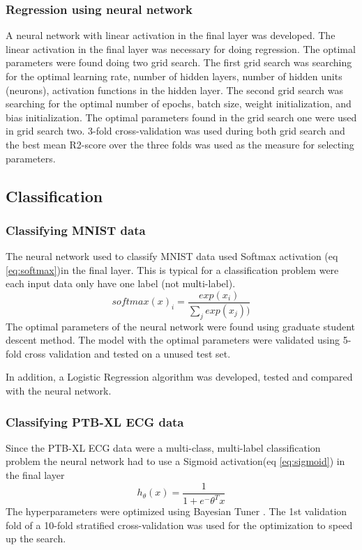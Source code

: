 \documentclass[twocolumn]{cinc}
\begin{document}
\subsubsection{Regression using neural network}
A neural network with linear activation in the final layer was developed. The linear activation in the final layer was necessary for doing regression. The optimal parameters were found doing two grid search. The first grid search was searching for the optimal learning rate, number of hidden layers, number of hidden units (neurons), activation functions in the hidden layer. The second grid search was searching for the optimal number of epochs, batch size, weight initialization, and bias initialization. The optimal parameters found in the grid search one were used in grid search two. 3-fold cross-validation was used during both grid search and the best mean R2-score over the three folds was used as the measure for selecting parameters.

\subsection{Classification}
\subsubsection{Classifying MNIST data}

The neural network used to classify MNIST data used Softmax activation (eq \ref{eq:softmax})in the final layer. This is typical for a classification problem were each input data only have one label (not multi-label).
\begin{equation}
softmax(x)_i = \frac{exp(x_i)}{\sum_{j}^{ }exp(x_j))}
\label{eq:softmax}
\end{equation}
The optimal parameters of the neural network were found using graduate student descent method. The model with the optimal parameters were validated using 5-fold cross validation and tested on a unused test set.

In addition, a Logistic Regression algorithm was developed, tested and compared with the neural network.

\subsubsection{Classifying PTB-XL ECG data}
Since the PTB-XL ECG data were a multi-class, multi-label classification problem the neural network had to use a Sigmoid activation(eq \ref{eq:sigmoid}) in the final layer
\begin{equation}
h_ \theta (x) =  \frac{\mathrm{1} }{\mathrm{1} + e^-\theta^Tx}
    \label{eq:sigmoid}
\end{equation}
The hyperparameters were optimized using Bayesian Tuner \cite{omalley_keras_2019}. The 1st validation fold of a 10-fold stratified cross-validation was used for the optimization to speed up the search. 
\end{document}
